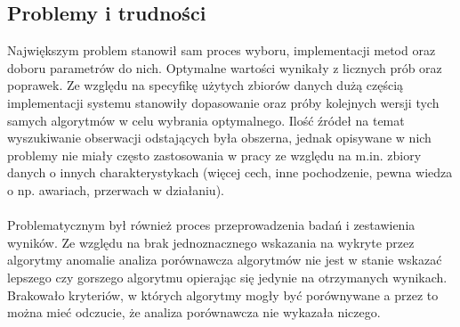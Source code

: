 \documentclass[eng,printmode]{mgr}
\begin{document}
\subsection{Problemy i trudności}
Największym problem stanowił sam proces wyboru, implementacji metod oraz doboru parametrów do nich. Optymalne wartości wynikały z licznych prób oraz poprawek. Ze względu na specyfikę użytych zbiorów danych dużą częścią implementacji systemu stanowiły dopasowanie oraz próby kolejnych wersji tych samych algorytmów w celu wybrania optymalnego. Ilość źródeł na temat wyszukiwanie obserwacji odstających była obszerna, jednak opisywane w nich problemy nie miały często zastosowania w pracy ze względu na m.in. zbiory danych o innych charakterystykach (więcej cech, inne pochodzenie, pewna wiedza o np. awariach, przerwach w działaniu).
\\\\ 
Problematycznym był również proces przeprowadzenia badań i zestawienia wyników. Ze względu na brak jednoznacznego wskazania na wykryte przez algorytmy anomalie analiza porównawcza algorytmów nie jest w stanie wskazać lepszego czy gorszego algorytmu opierając się jedynie na otrzymanych wynikach. Brakowało kryteriów, w których algorytmy mogły być porównywane a przez to można mieć odczucie, że analiza porównawcza nie wykazała niczego.
\end{document}
